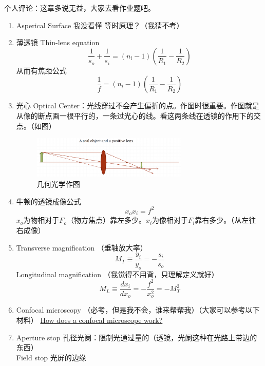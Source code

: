 \documentclass{ctexart}
\begin{document}
个人评论：这章多说无益，大家去看作业题吧。
\begin{enumerate}
\item Asperical Surface 我没看懂 等时原理？（我猜不考）
\item 薄透镜 Thin-lens equation
\begin{equation}
\frac{1}{s_{o}}+\frac{1}{s_{i}}=\left(n_{l}-1\right)\left(\frac{1}{R_{1}}-\frac{1}{R_{2}}\right)
\end{equation}
从而有焦距公式
\begin{equation}
\frac{1}{f}=\left(n_{l}-1\right)\left(\frac{1}{R_{1}}-\frac{1}{R_{2}}\right)
\end{equation}
\item 光心 Optical Center：光线穿过不会产生偏折的点。作图时很重要。作图就是从像的断点画一根平行的，一条过光心的线。看这两条线在透镜的作用下的交点。（如图）
\begin{figure}
\center
\includegraphics[width=0.7\textwidth]{几何光学作图.png}
\caption{几何光学作图}
\end{figure}
\item 牛顿的透镜成像公式
\begin{equation}
x_{o} x_{i}=f^{2}
\end{equation}
$x_{o}$为物相对于$F_o$（物方焦点）靠左多少。$x_i$为像相对于$F_i$靠右多少。（从左往右成像）
\item Transverse magnification （垂轴放大率）
\begin{equation}
M_{T} \equiv \frac{y_{i}}{y_{o}}=-\frac{s_{i}}{s_{o}}
\end{equation}
Longitudinal magnification  （我觉得不用背，只理解定义就好）
\begin{equation}
M_{L} \equiv \frac{d x_{i}}{d x_{o}}=-\frac{f^{2}}{x_{o}^{2}}=-M_{T}^{2}
\end{equation} 
\item Confocal microscopy （必考，但是我不会，谁来帮帮我）（大家可以参考以下材料）
\href{http://www.physics.emory.edu/faculty/weeks//confocal/}{How does a confocal microscope work?} 
\item Aperture stop 孔径光阑：限制光通过量的（透镜，光阑这种在光路上带边的东西）\\
Field stop 光屏的边缘\\

\end{enumerate}
\end{document}
